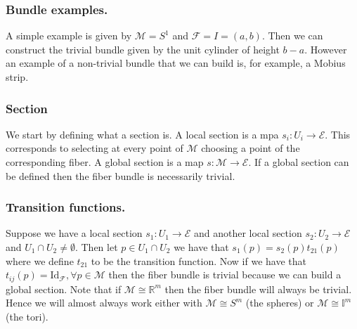 \documentclass[10pt,a4paper]{book}
\begin{document}
\subsubsection{Bundle examples.}
A simple example is given by $\mathcal{M} = S^1$ and $\mathcal{F} = I = (a, b)$. Then we can construct the trivial bundle given by the unit cylinder of height $b - a$. However an example of a non-trivial bundle that we can build is, for example, a Mobius strip. 

\subsubsection{Section}
We start by defining what a section is. A local section is a mpa $s_i : U_i \to \mathcal{E}$. This corresponds to selecting at every point of $\mathcal{M}$ choosing a point of the corresponding fiber. A global section is a map $s : \mathcal{M} \to \mathcal{E}$. If a global section can be defined then the fiber bundle is necessarily trivial.

\subsubsection{Transition functions.}
Suppose we have a local section $s_1: U_1 \to \mathcal{E}$ and another local section $s_2 : U_2 \to \mathcal{E}$ and $U_1 \cap U_2 \neq \emptyset$. Then let $p \in U_1 \cap U_2$ we have that $s_1(p) = s_2(p)t_{21}(p)$ where we define $t_{21}$ to be the transition function. Now if we have that $t_{ij}(p) =  \text{Id}_\mathcal{F}, \forall p \in \mathcal{M}$ then the fiber bundle is trivial because we can build a global section. Note that if $\mathcal{M} \cong \mathbb{R}^m$ then the fiber bundle will always be trivial. Hence we will almost always work either with $\mathcal{M} \cong S^m$ (the spheres) or $\mathcal{M} \cong \mathbb{I}^m$ (the tori). 
\end{document}
